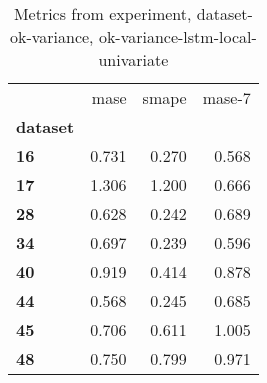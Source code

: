 \begin{table}[h]
\centering
\caption{Metrics from experiment, dataset-ok-variance, ok-variance-lstm-local-univariate}
\label{table:ok-variance-lstm-local-univariate-dataset-ok-variance}
\begin{tabular}{lrrr}
\toprule
{} &   mase &  smape &  mase-7 \\
\textbf{dataset} &        &        &         \\
\midrule
\textbf{16     } &  0.731 &  0.270 &   0.568 \\
\textbf{17     } &  1.306 &  1.200 &   0.666 \\
\textbf{28     } &  0.628 &  0.242 &   0.689 \\
\textbf{34     } &  0.697 &  0.239 &   0.596 \\
\textbf{40     } &  0.919 &  0.414 &   0.878 \\
\textbf{44     } &  0.568 &  0.245 &   0.685 \\
\textbf{45     } &  0.706 &  0.611 &   1.005 \\
\textbf{48     } &  0.750 &  0.799 &   0.971 \\
\bottomrule
\end{tabular}
\end{table}
